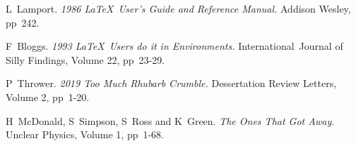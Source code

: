 \documentclass[12pt,a4paper]{report}
\begin{document}
\begin{thebibliography}{100}

 L~Lamport. \emph{1986 \LaTeX\  User's Guide and Reference Manual.} Addison Wesley, pp~242.

 F~Bloggs. \emph{1993 \LaTeX\  Users do it in Environments.} International~Journal of Silly Findings, Volume 22, pp~23-29.

 P~Thrower. \emph{2019 Too Much Rhubarb Crumble.} Dessertation Review Letters, Volume 2, pp~1-20.

 H~McDonald, S~Simpson, S~Ross and K~Green. \emph{The Ones That Got Away.} Unclear Physics, Volume 1, pp~1-68.



\end{thebibliography}
\end{document}
